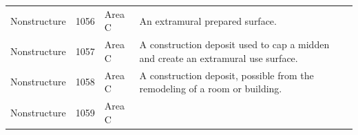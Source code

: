 \documentclass[
  12pt,
]{krantz}
\begin{document}
\begin{longtable}[]{@{}llll@{}}
\begin{minipage}[t]{0.18\columnwidth}
Nonstructure\strut
\end{minipage} & \begin{minipage}[t]{0.11\columnwidth}\raggedright
1056\strut
\end{minipage} & \begin{minipage}[t]{0.16\columnwidth}\raggedright
Area C\strut
\end{minipage} & \begin{minipage}[t]{0.38\columnwidth}\raggedright
An extramural prepared
surface.\strut
\end{minipage}\tabularnewline
\begin{minipage}[t]{0.18\columnwidth}\raggedright
Nonstructure\strut
\end{minipage} & \begin{minipage}[t]{0.11\columnwidth}\raggedright
1057\strut
\end{minipage} & \begin{minipage}[t]{0.16\columnwidth}\raggedright
Area C\strut
\end{minipage} & \begin{minipage}[t]{0.38\columnwidth}\raggedright
A construction deposit used
to cap a midden and create
an extramural use surface.\strut
\end{minipage}\tabularnewline
\begin{minipage}[t]{0.18\columnwidth}\raggedright
Nonstructure\strut
\end{minipage} & \begin{minipage}[t]{0.11\columnwidth}\raggedright
1058\strut
\end{minipage} & \begin{minipage}[t]{0.16\columnwidth}\raggedright
Area C\strut
\end{minipage} & \begin{minipage}[t]{0.38\columnwidth}\raggedright
A construction deposit,
possible from the remodeling
of a room or building.\strut
\end{minipage}\tabularnewline
\begin{minipage}[t]{0.18\columnwidth}\raggedright
Nonstructure\strut
\end{minipage} & \begin{minipage}[t]{0.11\columnwidth}\raggedright
1059\strut
\end{minipage} & \begin{minipage}[t]{0.16\columnwidth}\raggedright
Area C\strut
\end{minipage} & \begin{minipage}[t]{0.38\columnwidth}\raggedright

\end{minipage}
\end{longtable}
\end{document}

